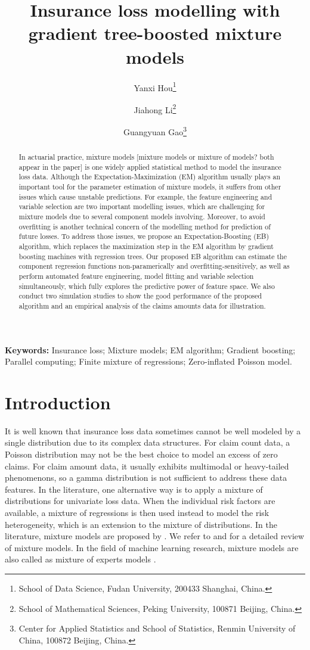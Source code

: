\documentclass[11pt]{article}
\title{Insurance loss modelling with gradient tree-boosted mixture models}
\author{ Yanxi Hou\footnote{School of Data Science, Fudan University, 200433 Shanghai, China.} \and Jiahong Li\footnote{School of Mathematical Sciences, Peking University, 100871 Beijing, China.} \and Guangyuan Gao\footnote{Center for Applied Statistics and School of Statistics, Renmin University of China, 100872 Beijing, China.}}
\numberwithin{equation}{section}
\begin{document}
\maketitle

\begin{abstract}
\noindent 
In actuarial practice, mixture models {\color{blue}[mixture models or mixture of models? both appear in the paper]} is one widely applied statistical method to model the insurance loss data. 
Although the Expectation-Maximization (EM) algorithm usually plays an important tool for the parameter estimation of mixture  models, it suffers from other issues which cause unstable predictions. 
For example, the feature engineering and variable selection are two important modelling issues, which are challenging for mixture models due to several component models involving. 
Moreover, to avoid overfitting is another technical concern of the modelling method for prediction of future losses. 
To address those issues, we propose an Expectation-Boosting (EB) algorithm, 
which replaces the maximization step in the EM algorithm by gradient boosting machines with regression trees. 
Our proposed EB algorithm can estimate the component regression functions non-paramerically and overfitting-sensitively, as well as
perform automated feature engineering, model fitting and variable selection simultaneously, which
fully explores the predictive power of feature space.
We also conduct two simulation studies to show the good performance of the proposed algorithm and an empirical analysis of the claims amounts data for illustration. 

\end{abstract}

{\bf Keywords:} Insurance loss; Mixture models; EM algorithm; Gradient boosting; Parallel computing; Finite mixture of regressions; Zero-inflated Poisson model. 


\section{Introduction}

It is well known that insurance loss data sometimes cannot be well modeled by a single distribution due to its complex data structures.
For claim count data, a Poisson distribution may not be the best choice to model an excess of zero claims.
For claim amount data, it usually exhibits multimodal or heavy-tailed phenomenons, so a gamma distribution is not sufficient to address these data features.
In the literature, one alternative way is to apply a mixture of distributions for univariate loss data.
When the individual risk factors are available, a mixture of regressions is then used instead to model the risk heterogeneity, which is an extension to the mixture of distributions. 
In the literature,
mixture models are proposed by \citet{goldfeld1973markov}.
We refer to \citet{lindsay1995mixture} and \citet{peel2000finite} for a detailed review of mixture models.
In the field of machine learning research, mixture models are also called as mixture of experts models \citep{jacobs1991adaptive,jiang1999hierarchical}.
\end{document}
